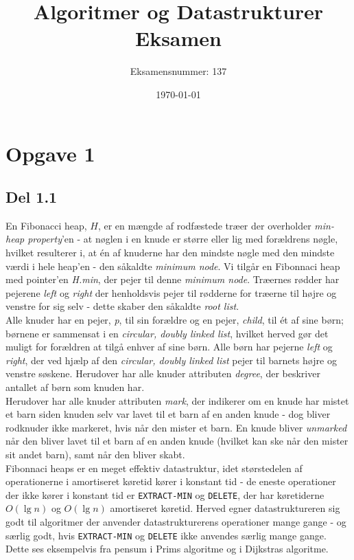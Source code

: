 \documentclass{report}
\title{Algoritmer og Datastrukturer Eksamen}
\author{Eksamensnummer: 137}
\date{\today}
\begin{document}
\maketitle


\section*{Opgave 1}
\subsection*{Del 1.1}
En Fibonacci heap, $H$, er en mængde af rodfæstede træer der overholder \textit{min-heap property}'en - at nøglen i en knude er større eller lig med forældrens nøgle, hvilket resulterer i, at én af knuderne har den mindste nøgle med den mindste værdi i hele heap'en - den såkaldte  \textit{minimum node}. Vi tilgår en Fibonnaci heap med pointer'en \textit{H.min}, der pejer til denne  \textit{minimum node}. Træernes rødder har pejerene \textit{left} og \textit{right} der henholdsvis pejer til rødderne for træerne til højre og venstre for sig selv - dette skaber den såkaldte \textit{root list}. \\
Alle knuder har en pejer, \textit{p}, til sin forældre og en pejer, \textit{child}, til ét af sine børn; børnene er sammensat i en \textit{circular, doubly linked list}, hvilket herved gør det muligt for forældren at tilgå enhver af sine børn. Alle børn har pejerne \textit{left} og \textit{right}, der ved hjælp af den \textit{circular, doubly linked list} pejer til barnets højre og venstre søskene. Herudover har alle knuder attributen \textit{degree}, der beskriver antallet af børn som knuden har. \\
Herudover har alle knuder attributen \textit{mark}, der indikerer om en knude har mistet et barn siden knuden selv var lavet til et barn af en anden knude - dog bliver rodknuder ikke markeret, hvis når den mister et barn. En knude bliver \textit{unmarked} når den bliver lavet til et barn af en anden knude (hvilket kan ske når den mister sit andet barn), samt når den bliver skabt. \\
Fibonnaci heaps er en meget effektiv datastruktur, idet størstedelen af operationerne i amortiseret køretid kører i konstant tid - de eneste operationer der ikke kører i konstant tid er \texttt{EXTRACT-MIN} og \texttt{DELETE}, der har køretiderne $O(\lg n)$ og $O(\lg n)$ amortiseret køretid. Herved egner datastruktureren sig godt til algoritmer der anvender datastrukturerens operationer mange gange - og særlig godt, hvis \texttt{EXTRACT-MIN} og \texttt{DELETE} ikke anvendes særlig mange gange. Dette ses eksempelvis fra pensum i Prims algoritme og i Dijkstras algoritme. \\
\end{document}
